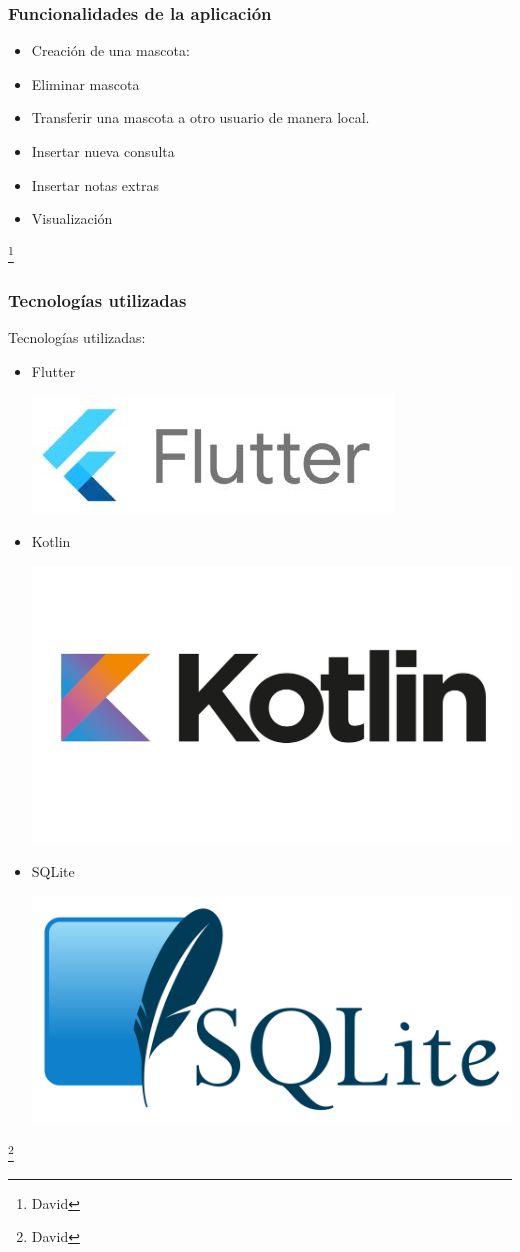\documentclass[14pt]{beamer}
\begin{document}
\begin{frame}
\frametitle{Funcionalidades de la aplicación}
\begin{itemize}
\item Creación de una mascota:
\item Eliminar mascota
\item Transferir una mascota a otro usuario de manera local.
\item Insertar nueva consulta
\item Insertar notas extras
\item Visualización
\end{itemize}
\footnote{David}
\end{frame}


\begin{frame}
\frametitle{Tecnologías utilizadas}

Tecnologías utilizadas:
\begin{itemize}
\item Flutter

\includegraphics[scale =0.32]{Images/LogodeFlutter.jpg}


\item Kotlin

\includegraphics[scale =0.08]{Images/LogoKotlin.jpg}
\item SQLite




\includegraphics[scale =0.07]{Images/LogodeSQLite.png}
\end{itemize}
\footnote{David}
\end{frame}
\end{document}
